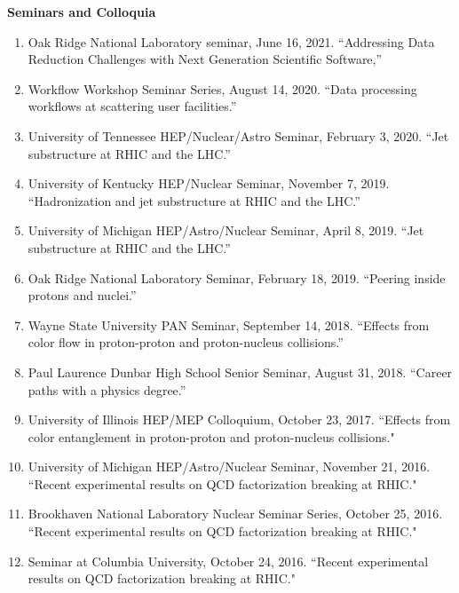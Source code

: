 \documentclass[11pt]{article}
\begin{document}
\vspace{7pt}
\begin{flushleft}
	\LARGE\textbf{Seminars and Colloquia} \\
	\normalsize
	\begin{enumerate}
		\item Oak Ridge National Laboratory seminar, June 16, 2021. ``Addressing Data Reduction Challenges with Next Generation Scientific Software,''
		\item Workflow Workshop Seminar Series, August 14, 2020. ``Data processing workflows at scattering user facilities.''
		\item University of Tennessee HEP/Nuclear/Astro Seminar, February 3, 2020. ``Jet substructure at RHIC and the LHC.''
		\item University of Kentucky HEP/Nuclear Seminar, November 7, 2019. ``Hadronization and jet substructure at RHIC and the LHC.''
		\item University of Michigan HEP/Astro/Nuclear Seminar, April 8, 2019. ``Jet substructure at RHIC and the LHC.''
		\item Oak Ridge National Laboratory Seminar, February 18, 2019. ``Peering inside protons and nuclei.''
		\item Wayne State University PAN Seminar, September 14, 2018. ``Effects from color flow in proton-proton and proton-nucleus collisions.''
		\item Paul Laurence Dunbar High School Senior Seminar, August 31, 2018. ``Career paths with a physics degree.''
		\item University of Illinois HEP/MEP Colloquium, October 23, 2017. ``Effects from color entanglement in proton-proton and proton-nucleus collisions."
		\item University of Michigan HEP/Astro/Nuclear Seminar, November 21, 2016. ``Recent experimental results on QCD factorization breaking at RHIC."
		\item Brookhaven National Laboratory Nuclear Seminar Series, October 25, 2016. ``Recent experimental results on QCD factorization breaking at RHIC."
		\item Seminar at Columbia University, October 24, 2016. ``Recent experimental results on QCD factorization breaking at RHIC."
		
	\end{enumerate}
\end{flushleft}

\vspace{7pt}
\end{document}

